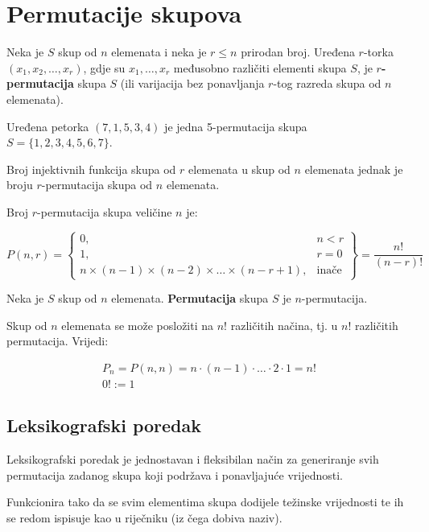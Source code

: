 \section{Permutacije skupova}

Neka je $S$ skup od $n$ elemenata i neka je $r\leq n$ prirodan broj. Uređena
$r$-torka $(x_1,x_2,\dots,x_r)$, gdje su $x_1,\dots,x_r$ međusobno različiti
elementi skupa $S$, je \textbf{$r$-permutacija} skupa $S$ (ili varijacija bez
ponavljanja $r$-tog razreda skupa od $n$ elemenata).

\begin{example}
    Uređena petorka $(7,1,5,3,4)$ je jedna 5-permutacija skupa $S=\{1,2,3,4,5,6,7\}$.
\end{example}

\begin{theorem}
    Broj injektivnih funkcija skupa od $r$ elemenata u skup od $n$ elemenata
    jednak je broju $r$-permutacija skupa od $n$ elemenata.
\end{theorem}

Broj $r$-permutacija skupa veličine $n$ je:

$$
P(n, r) =
    \begin{Bmatrix}
        0, & n < r\\
        1, & r = 0\\
        n \times (n - 1) \times (n - 2) \times \dots \times (n - r + 1), & \text{inače}
    \end{Bmatrix}
    = \frac{n!}{(n-r)!}
$$

Neka je $S$ skup od $n$ elemenata. \textbf{Permutacija} skupa $S$ je
$n$-permutacija.

Skup od $n$ elemenata se može posložiti na $n!$ različitih načina, tj. u $n!$
različitih permutacija. Vrijedi:

\begin{gather*}
    P_n = P(n, n) = n \cdot (n-1) \cdot \dots \cdot 2 \cdot 1 = n!\\
    0! := 1
\end{gather*}

\subsection{Leksikografski poredak}

Leksikografski poredak je jednostavan i fleksibilan način za generiranje svih
permutacija zadanog skupa koji podržava i ponavljajuće vrijednosti.

Funkcionira tako da se svim elementima skupa dodijele težinske vrijednosti te ih
se redom ispisuje kao u riječniku (iz čega dobiva naziv).

